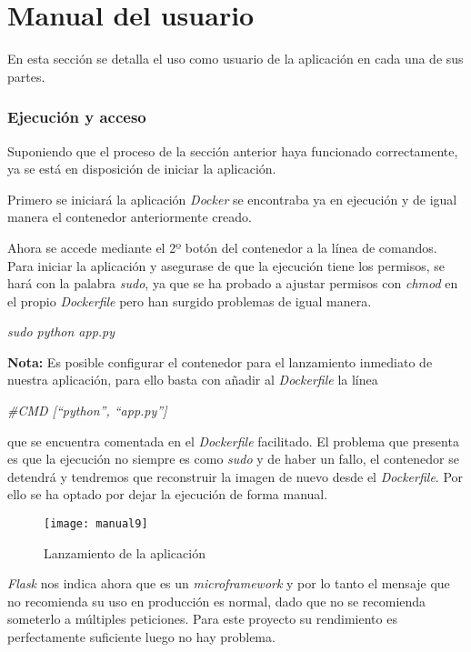 \section{Manual del usuario}
En esta sección se detalla el uso como usuario de la aplicación en cada una de sus partes.

\subsubsection{Ejecución y acceso}
Suponiendo que el proceso de la sección anterior haya funcionado correctamente, ya se está en disposición de iniciar la aplicación.

Primero se iniciará la aplicación \emph{Docker} se encontraba ya en ejecución y de igual manera el contenedor anteriormente creado.

Ahora se accede mediante el 2º botón del contenedor a la línea de comandos.
Para iniciar la aplicación y asegurase de que la ejecución tiene los permisos, se hará con la palabra \emph{sudo}, ya que se ha probado a ajustar permisos con \emph{chmod} en el propio \emph{Dockerfile} pero han surgido problemas de igual manera.

\begin{center}\emph{sudo python app.py}\end{center}

\textbf{Nota:} Es posible configurar el contenedor para el lanzamiento inmediato de nuestra aplicación, para ello basta con añadir al \emph{Dockerfile} la línea

\begin{center}\emph{\#CMD [``python'', ``app.py'']}\end{center}

que se encuentra comentada en el \emph{Dockerfile} facilitado. El problema que presenta es que la ejecución no siempre es como \emph{sudo} y de haber un fallo, el contenedor se detendrá y tendremos que reconstruir la imagen de nuevo desde el \emph{Dockerfile}. Por ello se ha optado por dejar la ejecución de forma manual.

    \begin{figure}[htb]
	\centering
	\texttt{[image: manual9]}
	\caption[Lanzamiento de la aplicación]{Lanzamiento de la aplicación}
    \end{figure}
    
\emph{Flask} nos indica ahora que es un \emph{microframework} y por lo tanto el mensaje que no recomienda su uso en producción es normal, dado que no se recomienda someterlo a múltiples peticiones. Para este proyecto su rendimiento es perfectamente suficiente luego no hay problema.

